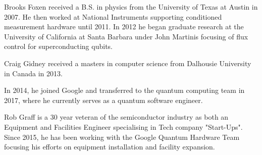 \documentclass[journal]{IEEEtran}
\begin{document}
\begin{IEEEbiography}{Brooks Foxen} received a B.S. in physics from the University of Texas at Austin in 2007.  He then worked at National Instruments supporting conditioned measurement hardware until 2011.  In 2012 he began graduate research at the University of California at Santa Barbara under John Martinis focusing of flux control for superconducting qubits.  


\end{IEEEbiography}
\begin{IEEEbiography}{Craig Gidney} received a masters in computer science from Dalhousie University in Canada in 2013.

In 2014, he joined Google and transferred to the quantum computing 
team in 2017, where he currently serves as a quantum software engineer.


\end{IEEEbiography}
\begin{IEEEbiography}{Rob Graff} is a 30 year veteran of the semiconductor industry as both an Equipment and Facilities Engineer specialising in Tech company "Start-Ups".   Since 2015, he has been working with the Google Quantum Hardware Team focusing his efforts on equipment installation and facility expansion.


\end{IEEEbiography}
\end{document}
